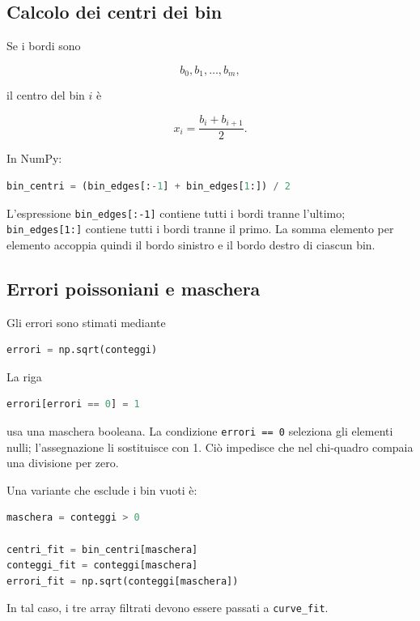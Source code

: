\subsection{Calcolo dei centri dei bin}

Se i bordi sono

\[
b_0,b_1,\ldots,b_m,
\]

il centro del bin $i$ è

\[
x_i=\frac{b_i+b_{i+1}}{2}.
\]

In NumPy:

\begin{lstlisting}[language=Python]
bin_centri = (bin_edges[:-1] + bin_edges[1:]) / 2
\end{lstlisting}

L'espressione \texttt{bin\_edges[:-1]} contiene tutti i bordi tranne
l'ultimo; \texttt{bin\_edges[1:]} contiene tutti i bordi tranne il primo.
La somma elemento per elemento accoppia quindi il bordo sinistro e il
bordo destro di ciascun bin.

\subsection{Errori poissoniani e maschera}

Gli errori sono stimati mediante

\begin{lstlisting}[language=Python]
errori = np.sqrt(conteggi)
\end{lstlisting}

La riga

\begin{lstlisting}[language=Python]
errori[errori == 0] = 1
\end{lstlisting}

usa una maschera booleana. La condizione \texttt{errori == 0} seleziona
gli elementi nulli; l'assegnazione li sostituisce con 1. Ciò impedisce
che nel chi-quadro compaia una divisione per zero.

Una variante che esclude i bin vuoti è:

\begin{lstlisting}[language=Python]
maschera = conteggi > 0

centri_fit = bin_centri[maschera]
conteggi_fit = conteggi[maschera]
errori_fit = np.sqrt(conteggi[maschera])
\end{lstlisting}

In tal caso, i tre array filtrati devono essere passati a
\texttt{curve\_fit}.

